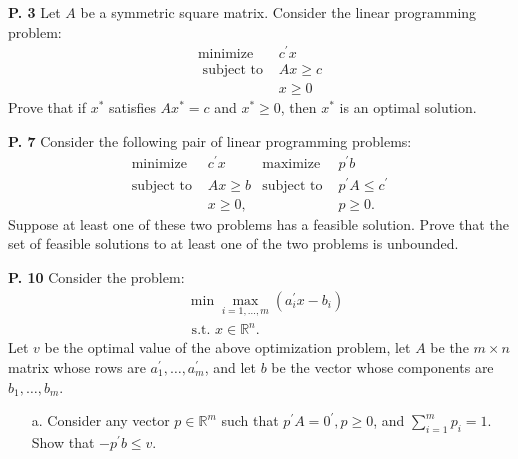 \documentclass{article}
\begin{document}
\begin{jacklist}
\begin{framed}
\begin{itemize}
        \end{itemize}
    \end{framed}
\newpage
    \begin{framed} 
    \item [\textbf{P. 3}] Let $A$ be a symmetric square matrix. Consider the linear programming problem: 
        \begin{align*}
            \text{minimize } & c^\prime x \\
            \text { subject to } & A x \geq c \\
            & x \geq 0
        \end{align*}
        Prove that if $x^{*}$ satisfies $A x^{*}=c$ and $x^{*} \geq 0$, then $x^{*}$ is an optimal solution.
    \end{framed}
\newpage
    \begin{framed} 
    \item [\textbf{P. 7}] Consider the following pair of linear programming problems:
        \begin{align*}
            \text{minimize } & c^{\prime} x & \text{maximize } & p^{\prime} b \\
            \text{subject to } & A x \geq b & \text{subject to } & p^{\prime} A \leq c^{\prime} \\
            & x \geq 0, & & p \geq 0 .
        \end{align*}
        Suppose at least one of these two problems has a feasible solution. Prove that the set of feasible solutions to at least 
        one of the two problems is unbounded.
    \end{framed}
\newpage
    \begin{framed} 
    \item [\textbf{P. 10}] Consider the problem: 
        \begin{align*}
            & \min \max _{i=1, \ldots, m}\left(a_{i}^{\prime} x-b_{i}\right) \\
            & \text { s.t. } x \in \mathbb{R}^{n} .
        \end{align*} Let $v$ be the optimal value of the above optimization problem, let $A$ be the $m \times n$ matrix whose 
        rows are $a_{1}^{\prime}, \ldots, a_{m}^{\prime}$, and let $b$ be the vector whose components are $b_{1}, \ldots, b_{m}$.
        \begin{itemize}
            \item [a.] Consider any vector $p \in \mathbb{R}^{m}$ such that $p^{\prime} A=0^{\prime}, p \geq 0$, and 
                $\sum_{i=1}^{m} p_{i}=1$. Show that $-p^{\prime} b \leq v$.

\end{itemize}
\end{framed}
\end{jacklist}
\end{document}
